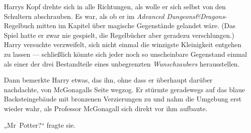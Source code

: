 Harrys Kopf drehte sich in alle Richtungen, als wolle er sich selbst von den Schultern abschrauben. Es war, als ob er im \emph{Advanced Dungeons\&Dragons}-Regelbuch mitten im Kapitel über magische Gegenstände gelandet wäre. (Das Spiel hatte er zwar nie gespielt, die Regelbücher aber geradezu verschlungen.) Harry versuchte verzweifelt, sich nicht einmal die winzigste Kleinigkeit entgehen zu lassen — schließlich könnte sich jeder noch so unscheinbare Gegenstand einmal als einer der drei Bestandteile eines unbegrenzten \emph{Wunschzaubers} herausstellen.

Dann bemerkte Harry etwas, das ihn, ohne dass er überhaupt darüber nachdachte, von McGonagalls Seite wegzog. Er stürmte geradewegs auf das blaue Backsteingebäude mit bronzenen Verzierungen zu und nahm die Umgebung erst wieder wahr, als Professor McGonagall sich direkt vor ihm aufbaute.

„Mr~Potter?“ fragte sie.

